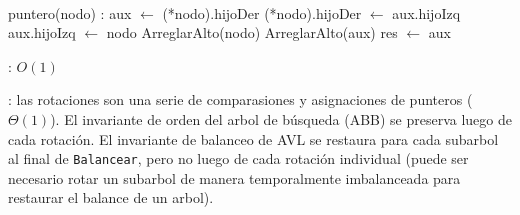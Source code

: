 \begin{Algoritmos}
	~

	\begin{algorithm}[H]
		\NoCaptionOfAlgo
		\caption{}
		\BlankLine
		puntero(nodo) : aux $\leftarrow$ (*nodo).hijoDer
		(*nodo).hijoDer $\leftarrow$ aux.hijoIzq
		aux.hijoIzq $\leftarrow$ nodo
		ArreglarAlto(nodo)
		ArreglarAlto(aux)
		res $\leftarrow$ aux
	\end{algorithm}
	
	\complejidad: $O(1)$

	\justifcomp: las rotaciones son una serie de comparasiones y asignaciones de punteros ($\Theta(1)$). El invariante de orden del arbol de búsqueda (ABB) se preserva luego de cada rotación. El invariante de balanceo de AVL se restaura para cada subarbol al final de \texttt{Balancear}, pero no luego de cada rotación individual (puede ser necesario rotar un subarbol de manera temporalmente imbalanceada para restaurar el balance de un arbol).

\end{Algoritmos}